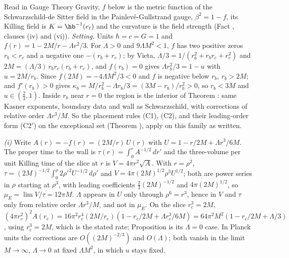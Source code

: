 Read in Gauge Theory Gravity, $f$ below is the metric function of the Schwarzschild-de Sitter field in the Painlev\'e-Gullstrand gauge, $\beta^{2} = 1 - f$, its Killing field is $K = \hb^{-1}(e_{t})$ and the curvature is the field strength (Fact , clauses (iv) and (vi)). \emph{Setting.} Units $\hbar = c = G = 1$ and $f(r) = 1 - 2M/r - \Lambda r^{2}/3$. For $\Lambda > 0$ and $9\Lambda M^{2} < 1$, $f$ has two positive zeros $r_{b} < r_{c}$ and a negative one $-(r_{b} + r_{c})$; by Vieta, $\Lambda/3 = 1/(r_{b}^{2} + r_{b}r_{c} + r_{c}^{2})$ and $2M = (\Lambda/3)\,r_{b}r_{c}(r_{b} + r_{c})$, and $f(r_{b}) = 0$ gives $\Lambda r_{b}^{2}/3 = 1 - u$ with $u = 2M/r_{b}$. Since $f(2M) = -4\Lambda M^{2}/3 < 0$ and $f$ is negative below $r_{b}$, $r_{b} > 2M$; and $f'(r_{b}) > 0$ gives $\kappa_{b} = M/r_{b}^{2} - \Lambda r_{b}/3 = (3M - r_{b})/r_{b}^{2} > 0$, so $r_{b} < 3M$ and $u \in (\tfrac23, 1)$. Inside $r_{b}$ near $r = 0$ the region is the interior of Theorem : same Kasner exponents, boundary data and wall as Schwarzschild, with corrections of relative order $\Lambda r^{3}/M$. So the placement rules (C1), (C2), and their leading-order form (C2$'$) on the exceptional set (Theorem ), apply on this family as written.

\emph{(i)} Write $A(r) = -f(r) = (2M/r)\,U(r)$ with $U = 1 - r/2M + \Lambda r^{3}/6M$. The proper time to the wall is $\tau(r) = \int_{0}^{r}A^{-1/2}\,dr'$ and the three-volume per unit Killing time of the slice at $r$ is $V = 4\pi r^{2}\sqrt{A}$. With $r = \rho^{2}$, $\tau = (2M)^{-1/2}\int_{0}^{\rho}2\rho'^{2}U^{-1/2}\,d\rho'$ and $V = 4\pi(2M)^{1/2}\rho^{3}U^{1/2}$; both are power series in $\rho$ starting at $\rho^{3}$, with leading coefficients $\tfrac23(2M)^{-1/2}$ and $4\pi(2M)^{1/2}$, so $\mu_{E} = \lim V/\tau = 12\pi M$. $\Lambda$ appears in $U$ only through $\rho^{6} = r^{3}$, hence in $V$ and $\tau$ only from relative order $\Lambda r^{3}/M$, and not in $\mu_{E}$. On the slice $r_{c}^{3} = 2M$, $(4\pi r_{c}^{2})^{2}A(r_{c}) = 16\pi^{2}r_{c}^{4}(2M/r_{c})(1 - r_{c}/2M + \Lambda r_{c}^{3}/6M) = 64\pi^{2}M^{2}(1 - r_{c}/2M + \Lambda/3)$, using $r_{c}^{3} = 2M$, which is the stated rate; Proposition  is its $\Lambda = 0$ case. In Planck units the corrections are $O((2M)^{-2/3})$ and $O(\Lambda)$; both vanish in the limit $M \to \infty$, $\Lambda \to 0$ at fixed $\Lambda M^{2}$, in which $u$ stays fixed.

